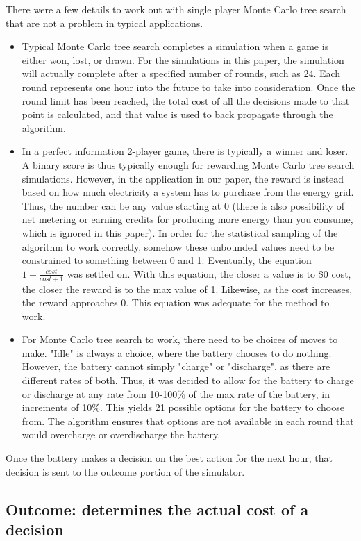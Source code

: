 There were a few details to work out with single player Monte Carlo tree search that are not a problem in typical applications.
\begin{itemize}
    \item Typical Monte Carlo tree search completes a simulation when a game is either won, lost, or drawn. For the simulations in this paper, the simulation will actually complete after a specified number of rounds, such as 24. Each round represents one hour into the future to take into consideration. Once the round limit has been reached, the total cost of all the decisions made to that point is calculated, and that value is used to back propagate through the algorithm.
    \item In a perfect information 2-player game, there is typically a winner and loser. A binary score is thus typically enough for rewarding Monte Carlo tree search simulations. However, in the application in our paper, the reward is instead based on how much electricity a system has to purchase from the energy grid. Thus, the number can be any value starting at 0 (there is also possibility of net metering or earning credits for producing more energy than you consume, which is ignored in this paper). In order for the statistical sampling of the algorithm to work correctly, somehow these unbounded values need to be constrained to something between 0 and 1. Eventually, the equation \(1 - \frac{cost}{cost + 1}\) was settled on. With this equation, the closer a value is to \$0 cost, the closer the reward is to the max value of 1. Likewise, as the cost increases, the reward approaches 0. This equation was adequate for the method to work.
    \item For Monte Carlo tree search to work, there need to be choices of moves to make. "Idle" is always a choice, where the battery chooses to do nothing. However, the battery cannot simply "charge" or "discharge", as there are different rates of both. Thus, it was decided to allow for the battery to charge or discharge at any rate from 10-100\% of the max rate of the battery, in increments of 10\%. This yields 21 possible options for the battery to choose from. The algorithm ensures that options are not available in each round that would overcharge or overdischarge the battery.
\end{itemize}

Once the battery makes a decision on the best action for the next hour, that decision is sent to the outcome portion of the simulator.

\subsection{Outcome: determines the actual cost of a decision}

